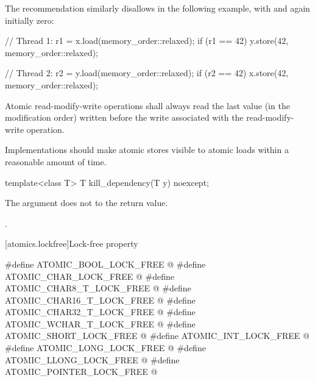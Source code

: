\pnum
\begin{note}
The recommendation similarly disallows  in the
following example, with  and  again initially zero:
\begin{codeblock}
// Thread 1:
r1 = x.load(memory_order::relaxed);
if (r1 == 42) y.store(42, memory_order::relaxed);
\end{codeblock}

\begin{codeblock}
// Thread 2:
r2 = y.load(memory_order::relaxed);
if (r2 == 42) x.store(42, memory_order::relaxed);
\end{codeblock}
\end{note}

\pnum
Atomic read-modify-write operations shall always read the last value
(in the modification order) written before the write associated with
the read-modify-write operation.

\pnum
Implementations should make atomic stores visible to atomic loads within a reasonable
amount of time.

%
\begin{itemdecl}
template<class T>
  T kill_dependency(T y) noexcept;
\end{itemdecl}

\begin{itemdescr}
\pnum
\effects
The argument does not
to the return value.

\pnum
\returns
{}.
\end{itemdescr}


[atomics.lockfree]{Lock-free property}

%
%
%
%
%
%
%
%
%
%
%
\begin{codeblock}
#define ATOMIC_BOOL_LOCK_FREE @\unspec@
#define ATOMIC_CHAR_LOCK_FREE @\unspec@
#define ATOMIC_CHAR8_T_LOCK_FREE @\unspec@
#define ATOMIC_CHAR16_T_LOCK_FREE @\unspec@
#define ATOMIC_CHAR32_T_LOCK_FREE @\unspec@
#define ATOMIC_WCHAR_T_LOCK_FREE @\unspec@
#define ATOMIC_SHORT_LOCK_FREE @\unspec@
#define ATOMIC_INT_LOCK_FREE @\unspec@
#define ATOMIC_LONG_LOCK_FREE @\unspec@
#define ATOMIC_LLONG_LOCK_FREE @\unspec@
#define ATOMIC_POINTER_LOCK_FREE @\unspec@
\end{codeblock}

